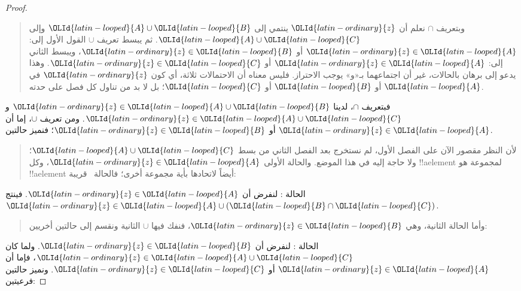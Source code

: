 \documentclass[../../../include/open-logic-section]{subfiles}
\begin{document}
\begin{proof}
\begin{quote}
وبتعريف $\cap$ نعلم أن $\OLId{latin-ordinary}{z}$ ينتمي إلى $\OLId{latin-looped}{A} \cup \OLId{latin-looped}{B}$ وإلى
$\OLId{latin-looped}{A} \cup \OLId{latin-looped}{C}$. ثم يبسط تعريف $\cup$ القول الأول إلى: $\OLId{latin-ordinary}{z} \in \OLId{latin-looped}{A}$ أو
$\OLId{latin-ordinary}{z} \in \OLId{latin-looped}{B}$، ويبسط الثاني إلى: $\OLId{latin-ordinary}{z} \in \OLId{latin-looped}{A}$ أو $\OLId{latin-ordinary}{z} \in \OLId{latin-looped}{C}$.
وهذا يدعو إلى برهان بالحالات، غير أن اجتماعهما بـ«و» يوجب الاحتراز.
فليس معناه أن الاحتمالات ثلاثة، أي كون $\OLId{latin-ordinary}{z}$ في $\OLId{latin-looped}{A}$ أو $\OLId{latin-looped}{B}$ أو $\OLId{latin-looped}{C}$؛ بل
لا بد من تناول كل فصل على حدته.
\end{quote}
فبتعريف $\cap$، لدينا $\OLId{latin-ordinary}{z} \in \OLId{latin-looped}{A} \cup \OLId{latin-looped}{B}$ و$\OLId{latin-ordinary}{z} \in \OLId{latin-looped}{A} \cup \OLId{latin-looped}{C}$. ومن
تعريف $\cup$، إما أن $\OLId{latin-ordinary}{z} \in \OLId{latin-looped}{A}$ أو $\OLId{latin-ordinary}{z} \in \OLId{latin-looped}{B}$؛ فنميز حالتين.
\begin{quote}
لأن النظر مقصور الآن على الفصل الأول، لم نستخرج بعد الفصل الثاني من
بسط $\OLId{latin-looped}{A} \cup \OLId{latin-looped}{C}$؛ ولا حاجة إليه في هذا الموضع. والحالة الأولى
$\OLId{latin-ordinary}{z} \in \OLId{latin-looped}{A}$، وكل !!a{element} لمجموعة هو !!a{element} أيضاً لاتحادها
بأية مجموعة أخرى؛ فالحالة~ قريبة:
\end{quote}
الحالة : لنفرض أن $\OLId{latin-ordinary}{z} \in \OLId{latin-looped}{A}$. فينتج $\OLId{latin-ordinary}{z} \in \OLId{latin-looped}{A} \cup (\OLId{latin-looped}{B} \cap \OLId{latin-looped}{C})$.
\begin{quote}
وأما الحالة الثانية، وهي $\OLId{latin-ordinary}{z} \in \OLId{latin-looped}{B}$، فنفك فيها $\cup$ الثانية ونقسم
إلى حالتين أخريين:
\end{quote}
الحالة : لنفرض أن $\OLId{latin-ordinary}{z} \in \OLId{latin-looped}{B}$. ولما كان $\OLId{latin-ordinary}{z} \in \OLId{latin-looped}{A} \cup \OLId{latin-looped}{C}$، فإما أن
$\OLId{latin-ordinary}{z} \in \OLId{latin-looped}{A}$ أو $\OLId{latin-ordinary}{z} \in \OLId{latin-looped}{C}$. ونميز حالتين فرعيتين:


\end{proof}
\end{document}

